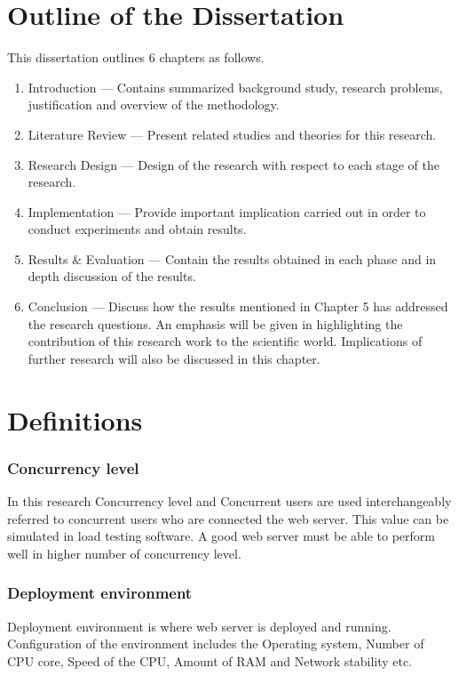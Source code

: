 \section{Outline of the Dissertation}

This dissertation outlines 6 chapters as follows.

\begin{enumerate}
	\item Introduction — Contains summarized background study, research problems, justification and overview of the methodology.
	\item Literature Review — Present related studies and theories for this research.
	\item Research Design — Design of the research with respect to each stage of the research.
	\item Implementation — Provide important implication carried out in order to conduct experiments and obtain results. 
	\item Results \& Evaluation — Contain the results obtained in each phase and in depth discussion of the results.
	\item Conclusion — Discuss how the results mentioned in Chapter 5 has addressed the research questions. An emphasis will be given in highlighting the contribution of this research work to the scientific world. Implications of further research will also be discussed in this chapter.
\end{enumerate}

\section{Definitions}

\subsubsection{Concurrency level}

In this research Concurrency level and Concurrent users are used interchangeably referred to concurrent users who are connected the web server. This value can be  simulated in load testing software. A good web server must be able to perform well in higher number of concurrency level.

\subsubsection{Deployment environment}

Deployment environment is where web server is deployed and running. Configuration of the environment includes the Operating system, Number of CPU core, Speed of the CPU, Amount of RAM and Network stability etc.

